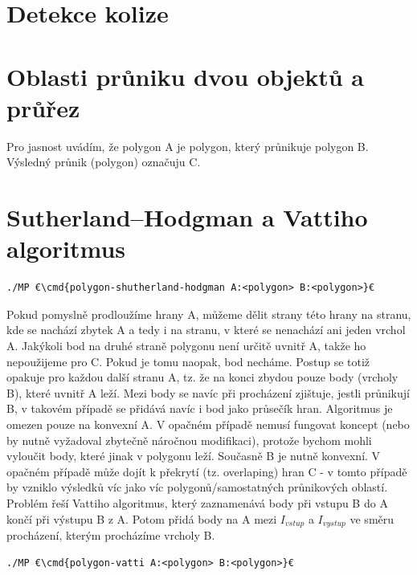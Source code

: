 \documentclass[a4paper,12pt]{book}
\newcommand{\cmd}[1]{\textcolor{blue}{\textbf{#1}}}
\begin{document}
\section{Detekce kolize}
\section{Oblasti průniku dvou objektů a průřez}





Pro jasnost uvádím, že polygon A je polygon, který průnikuje polygon B. Výsledný průnik (polygon) označuju C.

\section{Sutherland–Hodgman a Vattiho algoritmus}


\begin{lstlisting}
./MP €\cmd{polygon-shutherland-hodgman A:<polygon> B:<polygon>}€
\end{lstlisting}

Pokud pomyslně prodloužíme hrany A, můžeme dělit strany této hrany na stranu, kde se nachází zbytek A a tedy i na stranu, v které se nenachází ani jeden vrchol A. Jakýkoli bod na  druhé straně polygonu není určitě uvnitř A, takže ho nepoužijeme pro C. Pokud je tomu naopak, bod necháme. Postup se totiž opakuje pro každou další stranu A, tz. že na konci zbydou pouze body (vrcholy B), které uvnitř A leží. Mezi body se navíc při procházení zjištuje, jestli průnikují B, v takovém případě se přidává navíc i bod jako průsečík hran. Algoritmus je omezen pouze na konvexní A. V opačném případě nemusí fungovat koncept (nebo by nutně vyžadoval zbytečně náročnou modifikaci), protože bychom mohli vyloučit body, které jinak v polygonu leží. Současně B je nutně konvexní. V opačném případě může dojít k překrytí (tz. overlaping) hran C - v tomto případě by vzniklo výsledků víc jako víc polygonů/samostatných průnikových oblastí. Problém řeší Vattiho algoritmus, který zaznamenává body při vstupu B do A končí při výstupu B z A. Potom přidá body na A mezi $I_{vstup}$ a $I_{vystup}$ ve směru procházení, kterým procházíme vrcholy B.

\begin{lstlisting}
./MP €\cmd{polygon-vatti A:<polygon> B:<polygon>}€
\end{lstlisting}


\end{document}

